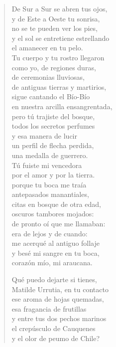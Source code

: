 \documentclass[12pt]{article}
\begin{document}
\begin{verse}
De Sur a Sur se abren tus ojos,\\
y de Este a Oeste tu sonrisa,\\
no se te pueden ver los pies,\\
y el sol se entretiene estrellando\\
el amanecer en tu pelo.\\
Tu cuerpo y tu rostro llegaron\\
como yo, de regiones duras,\\
de ceremonias lluviosas,\\
de antiguas tierras y martirios,\\
sigue cantando el Bío-Bío\\
en nuestra arcilla ensangrentada,\\
pero tú trajiste del bosque,\\
todos los secretos perfumes\\
y esa manera de lucir\\
un perfil de flecha perdida,\\
una medalla de guerrero.\\
Tú fuiste mi vencedora\\
por el amor y por la tierra.\\
porque tu boca me traía\\
antepasados manantiales,\\
citas en bosque de otra edad,\\
oscuros tambores mojados:\\
de pronto oí que me llamaban:\\
era de lejos y de cuando:\\
me acerqué al antiguo follaje\\
y besé mi sangre en tu boca,\\
corazón mío, mi araucana.  

Qué puedo dejarte si tienes,\\
Matilde Urrutia, en tu contacto\\
ese aroma de hojas quemadas,\\
esa fragancia de frutillas\\
y entre tus dos pechos marinos\\
el crepúsculo de Cauquenes\\
y el olor de peumo de Chile?  


\end{verse}
\end{document}
